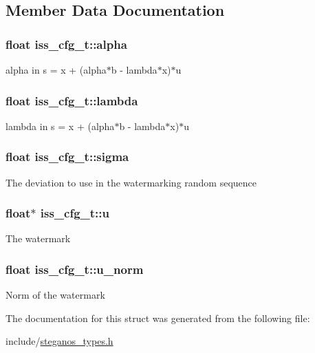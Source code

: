 \subsection{Member Data Documentation}
\hypertarget{structiss__cfg__t_a4b16d3ece6ea692acf197f2df92c3ac9}{
\subsubsection[{alpha}]{\setlength{\rightskip}{0pt plus 5cm}float {\bf iss\_\-cfg\_\-t::alpha}}}
\label{structiss__cfg__t_a4b16d3ece6ea692acf197f2df92c3ac9}
alpha in s = x + (alpha$\ast$b -\/ lambda$\ast$x)$\ast$u \hypertarget{structiss__cfg__t_afac615d52acc232cc5faaa99c4409634}{
\subsubsection[{lambda}]{\setlength{\rightskip}{0pt plus 5cm}float {\bf iss\_\-cfg\_\-t::lambda}}}
\label{structiss__cfg__t_afac615d52acc232cc5faaa99c4409634}
lambda in s = x + (alpha$\ast$b -\/ lambda$\ast$x)$\ast$u \hypertarget{structiss__cfg__t_ae21a5aff11ee728a5ad9d7820590361c}{
\subsubsection[{sigma}]{\setlength{\rightskip}{0pt plus 5cm}float {\bf iss\_\-cfg\_\-t::sigma}}}
\label{structiss__cfg__t_ae21a5aff11ee728a5ad9d7820590361c}
The deviation to use in the watermarking random sequence \hypertarget{structiss__cfg__t_ac26b5cb58083c80240bc55c19d890cc9}{
\subsubsection[{u}]{\setlength{\rightskip}{0pt plus 5cm}float$\ast$ {\bf iss\_\-cfg\_\-t::u}}}
\label{structiss__cfg__t_ac26b5cb58083c80240bc55c19d890cc9}
The watermark \hypertarget{structiss__cfg__t_a623850599b3c5314183412e955e41464}{
\subsubsection[{u\_\-norm}]{\setlength{\rightskip}{0pt plus 5cm}float {\bf iss\_\-cfg\_\-t::u\_\-norm}}}
\label{structiss__cfg__t_a623850599b3c5314183412e955e41464}
Norm of the watermark 

The documentation for this struct was generated from the following file:\begin{DoxyCompactItemize}
\item 
include/\hyperlink{steganos__types_8h}{steganos\_\-types.h}\end{DoxyCompactItemize}
